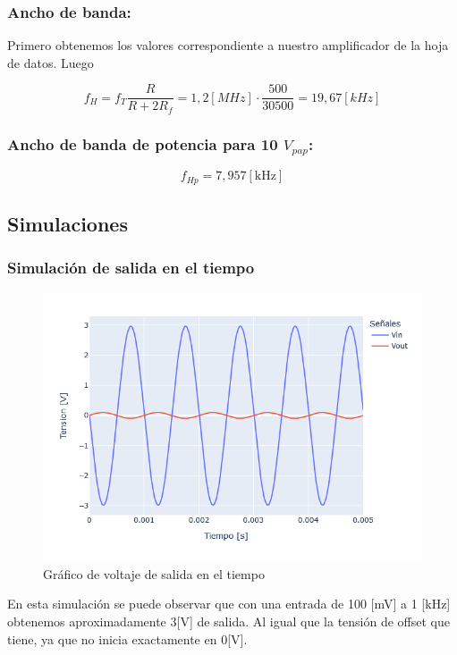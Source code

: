 \subsubsection{Ancho de banda:}

 Primero obtenemos los valores correspondiente a nuestro amplificador de la hoja de datos. Luego
 
\[ f_H = f_{T} \frac{R}{R+2 R_f} = 1,2 [MHz] \cdot \frac{500}{30500} = 19,67 [kHz] \]

\subsubsection{Ancho de banda de potencia para 10 \texorpdfstring{$V_{pap}$}{Vpap}:}
\[ f_{Hp}=7,957[\mathrm{kHz}] \]

  
 
\newpage

\subsection{Simulaciones}
\subsubsection{Simulación de salida en el tiempo}
 
\begin{figure}[h!]
    \centering
    \includegraphics[width=0.80\linewidth]{img/TP2_1_grafico_tiempo}
    \caption{Gráfico de voltaje de salida en el tiempo}
    \label{fig:1b_tiempo}
\end{figure}

En esta simulación se puede observar que con una entrada de 100 [mV] a 1 [kHz] obtenemos aproximadamente 3[V] de salida. Al igual que la tensión de offset que tiene, ya que no inicia exactamente en 0[V].


